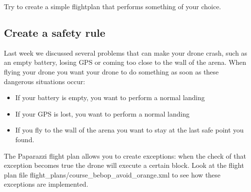 \documentclass{article}
\begin{document}
Try to create a simple flightplan that performs something of your choice. 

\subsection*{Create a safety rule}
Last week we discussed several problems that can make your drone crash, such as an empty battery, losing GPS or coming too close to the wall of the arena.
When flying your drone you want your drone to do something as soon as these dangerous situations occur:
\begin{itemize}
\item If your battery is empty, you want to perform a normal landing
\item If your GPS is lost, you want to perform a normal landing
\item If you fly to the wall of the arena you want to stay at the last safe point you found. 
\end{itemize}
The Paparazzi flight plan allows you to create exceptions: when the check of that exception becomes true the drone will execute a certain block. Look at the flight plan file flight\_plans/course\_bebop\_avoid\_orange.xml to see how these exceptions are implemented. 
\end{document}
